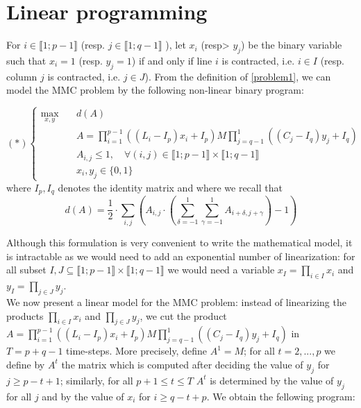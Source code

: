 
\section{Linear programming}\label{sec:linearprog}

For $i \in \llbracket 1; p-1 \rrbracket$ (resp.  $j \in \llbracket 1; q-1 \rrbracket$ ), let $x_i$ (resp> $y_j$) be the binary variable such that $x_i=1$ (resp. $y_j=1$) if and only if line $i$ is contracted, i.e. $i \in I$ (resp. column $j$ is contracted, i.e. $j \in J$). From the definition of \ref{problem1}, we can model the MMC problem by the following non-linear binary program:

\begin{equation*}
(\ast)\left\{
\begin{array}{lll}
\max\limits_{x,y}  \quad	& d(A)  \\
& A= \prod\limits_{i=1}^{p-1}((L_i-I_p)x_i+I_p)M\prod\limits_{j=q-1}^{1}((C_j-I_q)y_j+I_q) \\
& A_{i,j} \le 1, \quad \forall (i,j) \in \llbracket 1; p-1 \rrbracket \times \llbracket 1; q-1 \rrbracket \\
& x_i,y_j \in \{0,1\}
\end{array}\right.
\end{equation*}
where $I_p,I_q$ denotes the identity matrix and where we recall that $$d(A)= \frac{1}{2} \cdot \sum\limits_{i,j} \left( A_{i,j} \cdot \left(\sum\limits_{\delta = -1}^1 \sum\limits_{\gamma = -1}^1  A_{i+\delta,j+\gamma}\right) - 1 \right)$$

\noindent Although this formulation is very convenient to write the mathematical model, it is intractable as we would need to add an exponential number of linearization: for all subset $ I,J \subseteq \llbracket 1; p-1 \rrbracket \times \llbracket 1; q-1 \rrbracket$ we would need a variable $x_I=\prod\limits_{i \in I}x_i $ and $y_I=\prod\limits_{j \in J}y_j $.\\

\noindent We now present a linear model for the MMC problem: instead of linearizing the products $\prod\limits_{i \in I}x_i$ and $\prod\limits_{j \in J}y_j$, we cut the product \\
$A= \prod\limits_{i=1}^{p-1}((L_i-I_p)x_i+I_p)M\prod\limits_{j=q-1}^{1}((C_j-I_q)y_j+I_q) $ in $T=p+q-1$ time-steps. More precisely, define $A^1=M$; for all $t=2,...,p$ we define by $A^t$ the matrix which is computed after deciding the value of $y_j$ for $j \ge p-t+1$; similarly, for all $p+1\le t \le T$ $A^t$ is determined by the value of $y_j$ for all $j$ and by the value of $x_i$ for $i \ge q -t+p $. We obtain the fellowing program:

